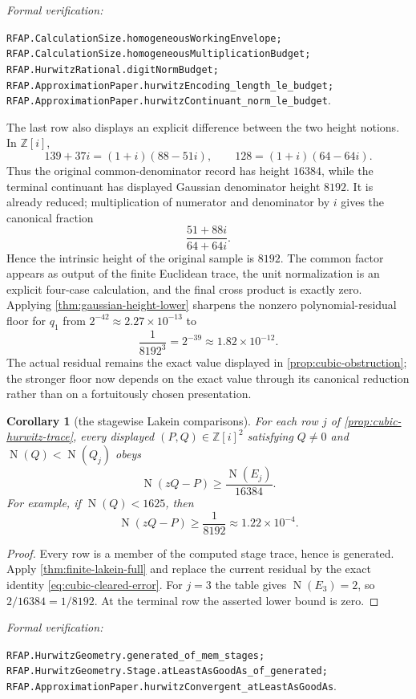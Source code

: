 \documentclass[11pt]{article}
\newtheorem{corollary}[corollary]{Corollary}
\newcommand{\Zi}{\mathbb{Z}[i]}
\newcommand{\Norm}[1]{\operatorname{N}\!\left(#1\right)}
\newcommand{\leanref}[1]{\par\smallskip\noindent
  \emph{Formal verification:}\par\nobreak
  {\raggedright\nolinkurl{#1}.\par}}
\begin{document}
\leanref{RFAP.CalculationSize.homogeneousWorkingEnvelope;
RFAP.CalculationSize.homogeneousMultiplicationBudget;
RFAP.HurwitzRational.digitNormBudget;
RFAP.ApproximationPaper.hurwitzEncoding_length_le_budget;
RFAP.ApproximationPaper.hurwitzContinuant_norm_le_budget}

The last row also displays an explicit difference between the two height
notions.  In $\Zi$,
\[
 139+37i=(1+i)(88-51i),\qquad
 128=(1+i)(64-64i).
\]
Thus the original common-denominator record has height $16384$, while the
terminal continuant has displayed Gaussian denominator height $8192$.  It is
already reduced; multiplication of numerator and denominator by $i$ gives
the canonical fraction
\[
                         \frac{51+88i}{64+64i}.
\]
Hence the intrinsic height of the original sample is $8192$.  The common
factor appears as output of the finite Euclidean trace, the unit
normalization is an explicit four-case calculation, and the final cross
product is exactly zero.  Applying
\cref{thm:gaussian-height-lower} sharpens the
nonzero polynomial-residual floor for $q_1$ from
$2^{-42}\approx2.27\mathbin{\times}10^{-13}$ to
\[
                   \frac1{8192^3}=2^{-39}
                     \approx1.82\mathbin{\times}10^{-12}.
\]
The actual residual remains the exact value displayed in
\cref{prop:cubic-obstruction}; the stronger floor now depends on the exact
value through its canonical reduction rather than on a fortuitously chosen
presentation.

\begin{corollary}[the stagewise Lakein comparisons]
\label{cor:cubic-lakein}
For each row $j$ of \cref{prop:cubic-hurwitz-trace}, every displayed
$(P,Q)\in\Zi^2$ satisfying $Q\ne0$ and
$\Norm Q<\Norm{Q_j}$ obeys
\[
             \Norm{zQ-P}\ge\frac{\Norm{E_j}}{16384}.
\]
For example, if $\Norm Q<1625$, then
\[
             \Norm{zQ-P}\ge\frac1{8192}
                     \approx1.22\mathbin{\times}10^{-4}.
\]
\end{corollary}

\begin{proof}
Every row is a member of the computed stage trace, hence is generated.  Apply
\cref{thm:finite-lakein-full} and replace the current residual by the exact
identity \eqref{eq:cubic-cleared-error}.  For $j=3$ the table gives
$\Norm{E_3}=2$, so $2/16384=1/8192$.  At the terminal row the asserted lower
bound is zero.
\end{proof}

\leanref{RFAP.HurwitzGeometry.generated_of_mem_stages;
RFAP.HurwitzGeometry.Stage.atLeastAsGoodAs_of_generated;
RFAP.ApproximationPaper.hurwitzConvergent_atLeastAsGoodAs}
\end{document}
